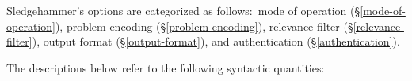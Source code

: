 \documentclass[a4paper,12pt]{article}
\begin{document}
\def\flushitem#1{\item[]\noindent\kern-\leftmargin \textbf{#1}}
\def\qty#1{$\left<\textit{#1}\right>$}
\def\qtybf#1{$\mathbf{\left<\textbf{\textit{#1}}\right>}$}
\def\optrue#1#2{\flushitem{\textit{#1} $\bigl[$= \qtybf{bool}$\bigr]$\enskip \defl\textit{true}\defr\hfill (neg.: \textit{#2})}\nopagebreak\\[\parskip]}
\def\opfalse#1#2{\flushitem{\textit{#1} $\bigl[$= \qtybf{bool}$\bigr]$\enskip \defl\textit{false}\defr\hfill (neg.: \textit{#2})}\nopagebreak\\[\parskip]}
\def\opsmart#1#2{\flushitem{\textit{#1} $\bigl[$= \qtybf{smart\_bool}$\bigr]$\enskip \defl\textit{smart}\defr\hfill (neg.: \textit{#2})}\nopagebreak\\[\parskip]}
\def\opsmartx#1#2{\flushitem{\textit{#1} $\bigl[$= \qtybf{smart\_bool}$\bigr]$\enskip \defl\textit{smart}\defr\hfill\\\hbox{}\hfill (neg.: \textit{#2})}\nopagebreak\\[\parskip]}
\def\opnodefault#1#2{\flushitem{\textit{#1} = \qtybf{#2}} \nopagebreak\\[\parskip]}
\def\opnodefaultbrk#1#2{\flushitem{$\bigl[$\textit{#1} =$\bigr]$ \qtybf{#2}} \nopagebreak\\[\parskip]}
\def\opdefault#1#2#3{\flushitem{\textit{#1} = \qtybf{#2}\enskip \defl\textit{#3}\defr} \nopagebreak\\[\parskip]}
\def\oparg#1#2#3{\flushitem{\textit{#1} \qtybf{#2} = \qtybf{#3}} \nopagebreak\\[\parskip]}
\def\opargbool#1#2#3{\flushitem{\textit{#1} \qtybf{#2} $\bigl[$= \qtybf{bool}$\bigr]$\hfill (neg.: \textit{#3})}\nopagebreak\\[\parskip]}
\def\opargboolorsmart#1#2#3{\flushitem{\textit{#1} \qtybf{#2} $\bigl[$= \qtybf{smart\_bool}$\bigr]$\hfill (neg.: \textit{#3})}\nopagebreak\\[\parskip]}

Sledgehammer's options are categorized as follows:\ mode of operation
(\S\ref{mode-of-operation}), problem encoding (\S\ref{problem-encoding}),
relevance filter (\S\ref{relevance-filter}), output format
(\S\ref{output-format}), and authentication (\S\ref{authentication}).

The descriptions below refer to the following syntactic quantities:
\end{document}
